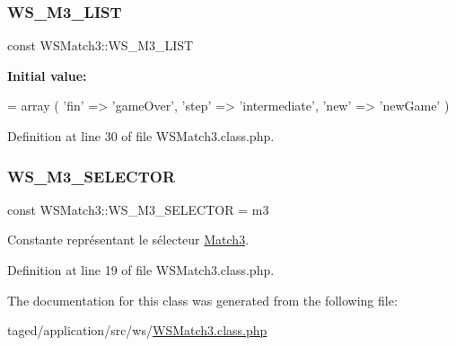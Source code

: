 \mbox{\label{class_w_s_match3_a13949996d08030d1bf5f17ad19f77c28}} 
\subsubsection{\texorpdfstring{W\+S\+\_\+\+M3\+\_\+\+L\+I\+ST}{WS\_M3\_LIST}}
{\footnotesize\ttfamily const W\+S\+Match3\+::\+W\+S\+\_\+\+M3\+\_\+\+L\+I\+ST}

{\bfseries Initial value\+:}
\begin{DoxyCode}
= array (
        \textcolor{stringliteral}{'fin'} => \textcolor{stringliteral}{'gameOver'},
        \textcolor{stringliteral}{'step'} => \textcolor{stringliteral}{'intermediate'},
        \textcolor{stringliteral}{'new'} => \textcolor{stringliteral}{'newGame'}
    )
\end{DoxyCode}


Definition at line 30 of file W\+S\+Match3.\+class.\+php.

\mbox{\label{class_w_s_match3_af985e7b6d16f369725456e078acbb3e2}} 
\subsubsection{\texorpdfstring{W\+S\+\_\+\+M3\+\_\+\+S\+E\+L\+E\+C\+T\+OR}{WS\_M3\_SELECTOR}}
{\footnotesize\ttfamily const W\+S\+Match3\+::\+W\+S\+\_\+\+M3\+\_\+\+S\+E\+L\+E\+C\+T\+OR = \textquotesingle{}m3\textquotesingle{}}

Constante représentant le sélecteur \hyperlink{class_match3}{Match3}. 

Definition at line 19 of file W\+S\+Match3.\+class.\+php.



The documentation for this class was generated from the following file\+:\begin{DoxyCompactItemize}
\item 
taged/application/src/ws/\hyperlink{_w_s_match3_8class_8php}{W\+S\+Match3.\+class.\+php}\end{DoxyCompactItemize}
